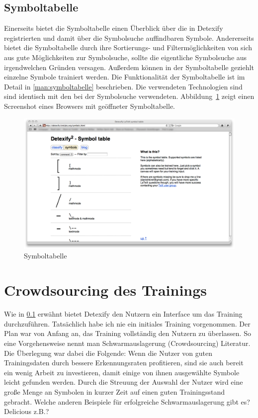 
\subsection{Symboltabelle} %
\label{sub:symboltabelle}

Einerseits bietet die Symboltabelle einen Überblick über die in Detexify registrierten und damit über die Symbolsuche auffindbaren Symbole. Andererseits bietet die Symboltabelle durch ihre Sortierungs- und Filtermöglichkeiten von sich aus gute Möglichkeiten zur Symbolsuche, sollte die eigentliche Symbolsuche aus irgendwelchen Gründen versagen. Außerdem können in der Symboltabelle geziehlt einzelne Symbole trainiert werden. Die Funktionalität der Symboltabelle ist im Detail in \ref{man:symboltabelle} beschrieben. Die verwendeten Technologien sind sind identisch mit den bei der Symbolsuche verwendeten.
 Abbildung~\ref{fig:symboltabelle} zeigt einen Screenshot eines Browsers mit geöffneter Symboltabelle.

\begin{figure}
  \centering \includegraphics[width=\textwidth]{figures/interface-symbol-table.png}
  \caption{Symboltabelle}
  \label{fig:symboltabelle}
\end{figure}



\section{Crowdsourcing des Trainings} %
\label{sec:crowdsourcing}

Wie in \ref{sub:symboltabelle} erwähnt bietet Detexify den Nutzern ein Interface um das Training durchzuführen. Tatsächlich habe ich nie ein initiales Training vorgenommen. Der Plan war von Anfang an, das Training vollständig den Nutzern zu überlassen. So eine Vorgehensweise nennt man Schwarmauslagerung (Crowdsourcing) \TODO Literatur. Die Überlegung war dabei die Folgende: Wenn die Nutzer von guten Trainingsdaten durch bessere Erkennungsraten profitieren, sind sie auch bereit ein wenig Arbeit zu investieren, damit einige von ihnen ausgewählte Symbole leicht gefunden werden. Durch die Streuung der Auswahl der Nutzer wird eine große Menge an Symbolen in kurzer Zeit auf einen guten Trainingsstand gebracht. \TODO Welche anderen Beispiele für erfolgreiche Schwarmauslagerung gibt es? Delicious z.B.?

